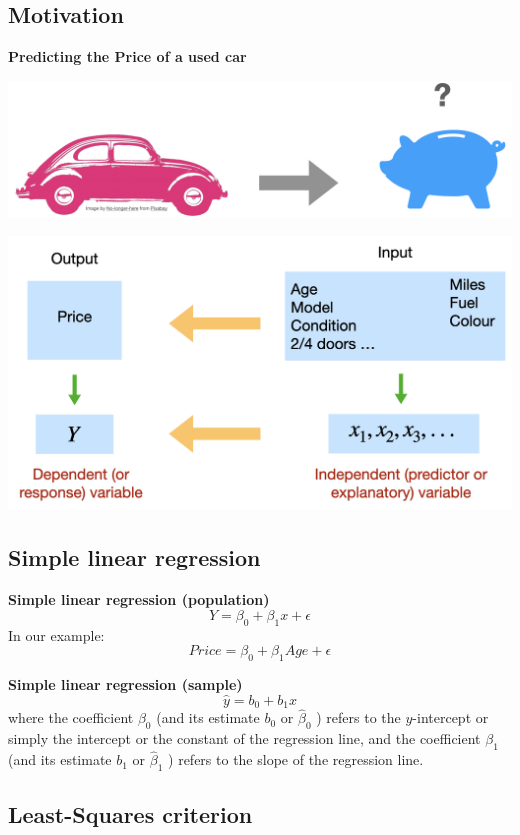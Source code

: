\documentclass[
]{article}
\begin{document}
\hypertarget{motivation-1}{%
\subsection{Motivation}\label{motivation-1}}

\textbf{Predicting the Price of a used car}

\begin{center}\includegraphics[width=0.6\linewidth,height=0.6\textheight]{figures/motivation1} \end{center}

\begin{center}\includegraphics[width=0.6\linewidth,height=0.6\textheight]{figures/motivation2} \end{center}

\hypertarget{simple-linear-regression-1}{%
\subsection{Simple linear regression}\label{simple-linear-regression-1}}

\textbf{Simple linear regression (population)}
\[Y=\beta_0+\beta_1 x+\epsilon\] In our example:
\[Price=\beta_0+\beta_1 Age+\epsilon\]

\textbf{Simple linear regression (sample)} \[\hat{y}=b_0+b_1 x\] where
the coefficient \(\beta_0\) (and its estimate \(b_0\) or
\(\hat{\beta}_0\) ) refers to the \(y\)-intercept or simply the
intercept or the constant of the regression line, and the coefficient
\(\beta_1\) (and its estimate \(b_1\) or \(\hat{\beta}_1\) ) refers to
the slope of the regression line.

\hypertarget{least-squares-criterion-1}{%
\subsection{Least-Squares criterion}\label{least-squares-criterion-1}}
\end{document}
